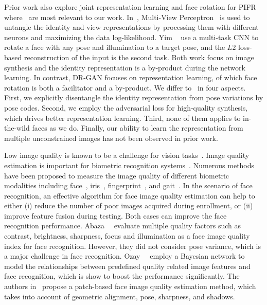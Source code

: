 \documentclass[10pt,journal,compsoc]{IEEEtran}
\begin{document}
Prior work also explore joint representation learning and face rotation for PIFR where~\cite{zhu2014multi,yim2015rotating} are most relevant to our work. 
In~\cite{zhu2014multi}, Multi-View Perceptron~\cite{zhu2014multi} is used to untangle the identity and view representations by processing them with different neurons and maximizing the data log-likelihood. 
Yim \etal~\cite{yim2015rotating} use a multi-task CNN to rotate a face with any pose and illumination to a target pose, and the $L2$ loss-based reconstruction of the input is the second task.
Both work focus on image synthesis and the identity representation is a by-product during the network learning. 
In contrast, DR-GAN focuses on representation learning, of which face rotation is both a facilitator and a by-product.
We differ to~\cite{zhu2014multi,yim2015rotating} in four aspects. 
First, we explicitly disentangle the identity representation from pose variations by pose codes. 
Second, we employ the adversarial loss for high-quality synthesis, which drives better representation learning. 
Third, none of them applies to in-the-wild faces as we do. 
Finally, our ability to learn the representation from multiple unconstrained images has not been observed in prior work.

Low image quality is known to be a challenge for vision tasks~\cite{face-model-fitting-on-low-resolution-images, fsrnet-end-to-end-learning-face-super-resolution-with-facial-priors}.
Image quality estimation is important for biometric recognition systems~\cite{bharadwaj2014biometric,grother2007performance, tong2010improving}.
Numerous methods have been proposed to measure the image quality of different biometric modalities including face~\cite{abaza2014design,abdel2007application,ozay2009improving}, iris~\cite{chen2006localized,krichen2007new}, fingerprint~\cite{tabassi2005novel,teixeira2016new}, and gait~\cite{muramatsu2016view,matovski2012including}. 
In the scenario of face recognition, 
an effective algorithm for face image quality estimation can help to either (i) reduce the number of poor images acquired during enrollment, or (ii) improve feature fusion during testing. 
Both cases can improve the face recognition performance. 
Abaza~\etal~\cite{abaza2014design} evaluate multiple quality factors such as contrast, brightness, sharpness, focus and illumination as a face image quality index for face recognition. 
However, they did not consider pose variance, which is a major challenge in face recognition. 
Ozay~\etal~\cite{ozay2009improving} employ a Bayesian network to model the relationships between predefined quality related image features and face recognition, which is show to boost the performance significantly. 
The authors in~\cite{wong2011patch} propose a patch-based face image quality estimation method, which takes into account of geometric alignment, pose, sharpness, and shadows. 
\end{document}
